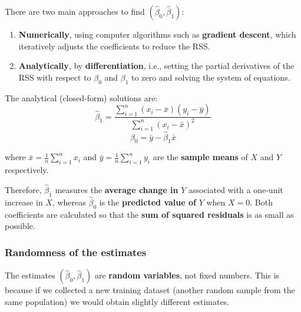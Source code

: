 \documentclass[
  letterpaper,
  DIV=11,
  numbers=noendperiod]{scrartcl}
\providecommand{\tightlist}{%
  \setlength{\itemsep}{0pt}\setlength{\parskip}{0pt}}\usepackage{longtable,booktabs,array}
\begin{document}
There are two main approaches to find
\((\hat{\beta}_0, \hat{\beta}_1)\):

\begin{enumerate}
\def\labelenumi{\arabic{enumi}.}
\tightlist
\item
  \textbf{Numerically}, using computer algorithms such as
  \textbf{gradient descent}, which iteratively adjusts the coefficients
  to reduce the RSS.
\item
  \textbf{Analytically}, by \textbf{differentiation}, i.e., setting the
  partial derivatives of the RSS with respect to \(\beta_0\) and
  \(\beta_1\) to zero and solving the system of equations.
\end{enumerate}

The analytical (closed-form) solutions are:
\[\hat{\beta}_1 = \frac{\sum_{i=1}^{n}(x_i - \bar{x})(y_i - \bar{y})}{\sum_{i=1}^{n}(x_i - \bar{x})^2}\]
\[\hat{\beta}_0 = \bar{y} - \hat{\beta}_1 \bar{x}\]

where \(\bar{x} = \frac{1}{n} \sum_{i=1}^{n} x_i\) and
\(\bar{y} = \frac{1}{n} \sum_{i=1}^{n} y_i\) are the \textbf{sample
means} of \(X\) and \(Y\) respectively.

Therefore, \(\hat{\beta}_1\) measures the \textbf{average change in}
\(Y\) associated with a one-unit increase in \(X\), whereas
\(\hat{\beta}_0\) is the \textbf{predicted value of} \(Y\) when
\(X = 0\). Both coefficients are calculated so that the \textbf{sum of
squared residuals} is as small as possible.

\subsubsection{Randomness of the
estimates}\label{randomness-of-the-estimates}

The estimates \((\hat{\beta}_0, \hat{\beta}_1)\) are \textbf{random
variables}, not fixed numbers. This is because if we collected a new
training dataset (another random sample from the same population) we
would obtain slightly different estimates.
\end{document}
